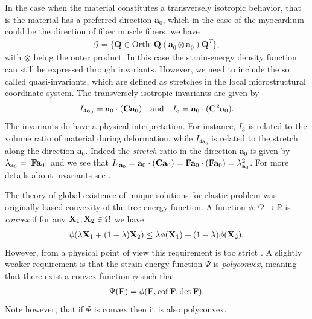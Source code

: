 In the case when the material constitutes a transversely isotropic
behavior, that is the material has a preferred direction $\mathbf{a}_0$,
which in the case of the myocardium could be the direction of fiber
muscle fibers, we have
\begin{align*}
  \mathcal{G} = \{ \mathbf{Q} \in \mathrm{Orth}: \mathbf{Q}(\mathbf{a}_0\otimes\mathbf{a}_0)\mathbf{Q}^T\},
\end{align*}
with $\otimes$ being the outer product. In this case the strain-energy
density function can still be expressed through invariants. However,
we need to include the so called quasi-invariants, which are defined
as stretches in the local microstructural coordinate-system. The
transversely isotropic invariants are given by
\begin{align*}
  I_{4\mathbf{a}_0 } = \mathbf{a}_0 \cdot (\mathbf{C} \mathbf{a}_0) && \text{and} && I_5 = \mathbf{a}_0 \cdot (\mathbf{C}^2 \mathbf{a}_0).
\end{align*}
The invariants do have a physical interpretation. For instance, $I_3$
is related to the volume ratio of material during deformation, while
$I_{4\mathbf{a}_0 } $ is related to the stretch along the direction
$\mathbf{a}_0 $. Indeed the \emph{stretch} ratio in the direction
$\mathbf{a}_0$ is given by $\lambda_{\mathbf{a}_0} = | \mathbf{F} \mathbf{a}_0
|$ and we see that $I_{4\mathbf{a}_0 }  =  \mathbf{a}_0 \cdot (\mathbf{C}
\mathbf{a}_0) = \mathbf{F} \mathbf{a}_0 \cdot (\mathbf{F} \mathbf{a}_0) =
\lambda_{\mathbf{a}_0}^2$. For more details about invariants see
\cite{holzapfel2009constitutive,liu1982representations}.


The theory of global existence of unique solutions for elastic problem
was originally based convexity of the free energy function.
A function $\phi: \Omega \rightarrow \mathbb{R}$ is \emph{convex} if for any
$\mathbf{X}_1, \mathbf{X}_2 \in \Omega$ we have
\begin{align}
  \phi(\lambda \mathbf{X}_1+ (1-\lambda) \mathbf{X}_2)
  \leq \lambda \phi(\mathbf{X}_1)
  + (1-\lambda) \phi(\mathbf{X}_2).
\end{align}
However, from a physical point of view this requirement is too strict
\cite{ball1976convexity}. A slightly weaker requirement is that the
strain-energy function $\Psi$ is \emph{polyconvex}, meaning that there exist
a convex function $\phi$ such that
\begin{align*}
  \Psi(\mathbf{F}) = \phi(\mathbf{F}, \mathrm{cof} \hspace{0.05cm} \mathbf{F}, \det \mathbf{F}).
\end{align*}
Note however, that if $\Psi$ is convex then it is also polyconvex.




